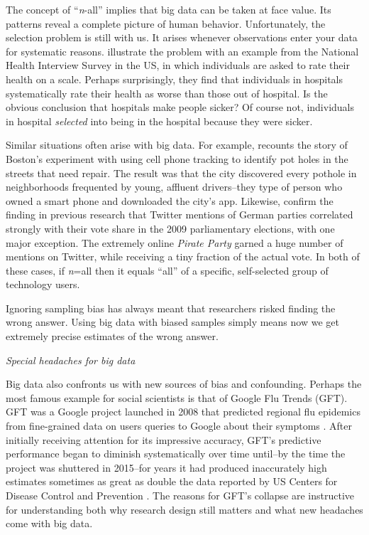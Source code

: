 \documentclass[12pt,]{article}
\begin{document}
The concept of ``\emph{n}-all'' implies that big data can be taken at
face value. Its patterns reveal a complete picture of human behavior.
Unfortunately, the selection problem is still with us. It arises
whenever observations enter your data for systematic reasons.
\citet{AP08} illustrate the problem with an example from the National
Health Interview Survey in the US, in which individuals are asked to
rate their health on a scale. Perhaps surprisingly, they find that
individuals in hospitals systematically rate their health as worse than
those out of hospital. Is the obvious conclusion that hospitals make
people sicker? Of course not, individuals in hospital \emph{selected}
into being in the hospital because they were sicker.

Similar situations often arise with big data. For example,
\citet{harford14} recounts the story of Boston's experiment with using
cell phone tracking to identify pot holes in the streets that need
repair. The result was that the city discovered every pothole in
neighborhoods frequented by young, affluent drivers--they type of person
who owned a smart phone and downloaded the city's app. Likewise,
\citet{TSSW10} confirm the finding in previous research that Twitter
mentions of German parties correlated strongly with their vote share in
the 2009 parliamentary elections, with one major exception. The
extremely online \emph{Pirate Party} garned a huge number of mentions on
Twitter, while receiving a tiny fraction of the actual vote. In both of
these cases, if \emph{n}=all then it equals ``all'' of a specific,
self-selected group of technology users.

Ignoring sampling bias has always meant that researchers risked finding
the wrong answer. Using big data with biased samples simply means now we
get extremely precise estimates of the wrong answer.

\emph{Special headaches for big data}

Big data also confronts us with new sources of bias and confounding.
Perhaps the most famous example for social scientists is that of Google
Flu Trends (GFT). GFT was a Google project launched in 2008 that
predicted regional flu epidemics from fine-grained data on users queries
to Google about their symptoms \citep{Getal2009}. After initially
receiving attention for its impressive accuracy, GFT's predictive
performance began to diminish systematically over time until--by the
time the project was shuttered in 2015--for years it had produced
inaccurately high estimates sometimes as great as double the data
reported by US Centers for Disease Control and Prevention
\citep{harford14}. The reasons for GFT's collapse are instructive for
understanding both why research design still matters and what new
headaches come with big data.
\end{document}
